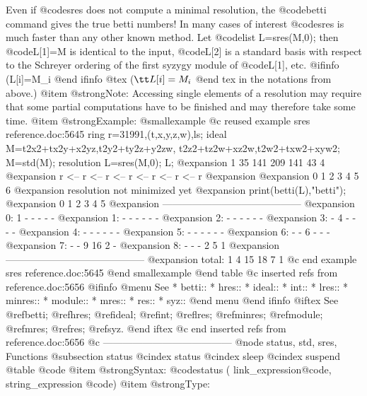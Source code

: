 {{{{{{{Even if @code{sres} does not compute a minimal resolution, the @code{betti}
command gives the true betti numbers! In many cases of interest
@code{sres} is much faster than any other known method.
Let @code{list L=sres(M,0);} then @code{L[1]=M} is identical to the input,
@code{L[2]} is a standard basis with respect to the Schreyer ordering of
the first syzygy
module of @code{L[1]}, etc.
@ifinfo
(L[i]=M_i
@end ifinfo
@tex
(${\tt L[i]}=M_i$
@end tex
 in the notations from above.)
@item @strong{Note:}
Accessing single elements of a resolution may require that some partial
computations have to be finished and may therefore take some time.
@item @strong{Example:}
@smallexample
@c reused example sres reference.doc:5645 
  ring r=31991,(t,x,y,z,w),ls;
  ideal M=t2x2+tx2y+x2yz,t2y2+ty2z+y2zw,
          t2z2+tz2w+xz2w,t2w2+txw2+xyw2;
  M=std(M);
  resolution L=sres(M,0);
  L;
@expansion{}  1      35      141      209      141      43      4      
@expansion{} r <--  r <--   r <--    r <--    r <--    r <--   r
@expansion{} 
@expansion{} 0      1       2        3        4        5       6      
@expansion{} resolution not minimized yet
@expansion{} 
  print(betti(L),"betti");
@expansion{}            0     1     2     3     4     5
@expansion{} ------------------------------------------
@expansion{}     0:     1     -     -     -     -     -
@expansion{}     1:     -     -     -     -     -     -
@expansion{}     2:     -     -     -     -     -     -
@expansion{}     3:     -     4     -     -     -     -
@expansion{}     4:     -     -     -     -     -     -
@expansion{}     5:     -     -     -     -     -     -
@expansion{}     6:     -     -     6     -     -     -
@expansion{}     7:     -     -     9    16     2     -
@expansion{}     8:     -     -     -     2     5     1
@expansion{} ------------------------------------------
@expansion{} total:     1     4    15    18     7     1
@c end example sres reference.doc:5645
@end smallexample
@end table
@c inserted refs from reference.doc:5656
@ifinfo
@menu
See
* betti::
* hres::
* ideal::
* int::
* lres::
* minres::
* module::
* mres::
* res::
* syz::
@end menu
@end ifinfo
@iftex
See
@ref{betti};
@ref{hres};
@ref{ideal};
@ref{int};
@ref{lres};
@ref{minres};
@ref{module};
@ref{mres};
@ref{res};
@ref{syz}.
@end iftex
@c end inserted refs from reference.doc:5656
@c ---------------------------------------
@node status, std, sres, Functions
@subsection status
@cindex status
@cindex sleep
@cindex suspend
@table @code
@item @strong{Syntax:}
@code{status (} link_expression@code{,} string_expression @code{)}
@item @strong{Type:}
}}}}}}}
